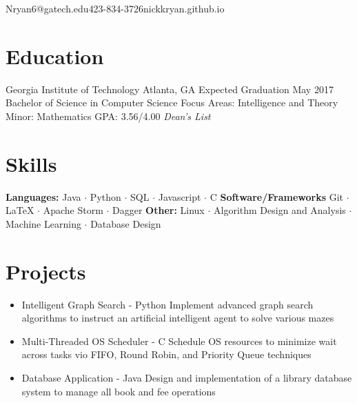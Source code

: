 \documentclass{resume_template}
\begin{document}
  
	
	\noindent{}
	{Nryan6@gatech.edu}{423-834-3726}{nickkryan.github.io}

	\section{Education}
 		\noindent\education
		{Georgia Institute of Technology}
		{Atlanta, GA}
		{Expected Graduation May 2017}
		{Bachelor of Science in Computer Science}
		{Focus Areas: Intelligence and Theory}
		{Minor: Mathematics}
		{GPA: 3.56/4.00 \textit{Dean's List}}
	\section{Skills}
	\noindent\textbf{Languages:} Java $\cdot$ Python $\cdot$ SQL $\cdot$ Javascript $\cdot$ C\newline
	\textbf{Software/Frameworks} Git $\cdot$ LaTeX $\cdot$ Apache Storm $\cdot$ Dagger\newline
	\textbf{Other:} Linux $\cdot$ Algorithm Design and Analysis $\cdot$ Machine Learning $\cdot$ Database Design
	\section{Projects}
	\noindent\begin{itemize}[leftmargin=0.4cm]
	\item Intelligent Graph Search - Python\newline
		\tab Implement advanced graph search algorithms to instruct an artificial intelligent agent to solve various mazes
	\item Multi-Threaded OS Scheduler - C\newline
		\tab Schedule OS resources to minimize wait across tasks vio FIFO, Round Robin, and Priority Queue techniques
	\item Database Application - Java\newline
		\tab Design and implementation of a library database system to manage all book and fee operations
	\end{itemize}
\end{document}
